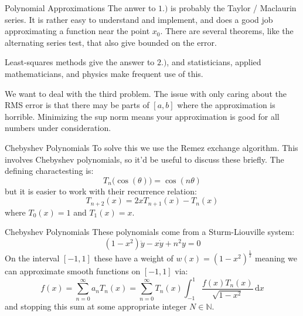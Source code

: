 \documentclass{beamer}
\begin{document}
    \begin{frame}{Polynomial Approximations}
        The anwer to $1.)$ is probably the Taylor / Maclaurin series.
        It is rather easy
        to understand and implement, and does a good job approximating a
        function near the point $x_{0}$. There are several theorems, like the
        alternating series test, that also give bounded on the error.
        \par\hfill\par
        Least-squares methods give the answer to $2.)$, and statisticians,
        applied mathematicians, and physics make frequent use of this.
        \par\hfill\par
        We want to deal with the third problem. The issue with only caring
        about the RMS error is that there may be parts of $[a,b]$ where
        the approximation is horrible. Minimizing the sup norm means your
        approximation is good for all numbers under consideration.
    \end{frame}
    \begin{frame}{Chebyshev Polynomials}
        To solve this we use the Remez exchange algorithm. This involves
        Chebyshev polynomials, so it'd be useful to discuss these briefly.
        The defining charactesting is:
        \begin{equation}
            T_{n}\big(\cos(\theta)\big)=\cos(n\theta)
        \end{equation}
        but it is easier to work with their recurrence relation:
        \begin{equation}
            T_{n+2}(x)=2xT_{n+1}(x)-T_{n}(x)
        \end{equation}
        where $T_{0}(x)=1$ and $T_{1}(x)=x$.
    \end{frame}
    \begin{frame}{Chebyshev Polynomials}
        These polynomials come from a Sturm-Liouville system:
        \begin{equation}
            (1-x^{2})\ddot{y}-x\dot{y}+n^{2}y=0
        \end{equation}
        On the interval $[-1,1]$ these have a weight of
        $w(x)=(1-x^{2})^{\frac{1}{2}}$ meaning we can approximate smooth
        functions on $[-1,1]$ via:
        \begin{equation}
            f(x)
            =\sum_{n=0}^{\infty}a_{n}T_{n}(x)
            =\sum_{n=0}^{\infty}T_{n}(x)\int_{-1}^{1}
                \frac{f(x)T_{n}(x)}{\sqrt{1-x^2}}\,\textrm{d}x
        \end{equation}
        and stopping this sum at some appropriate integer $N\in\mathbb{N}$.
    \end{frame}
\end{document}
